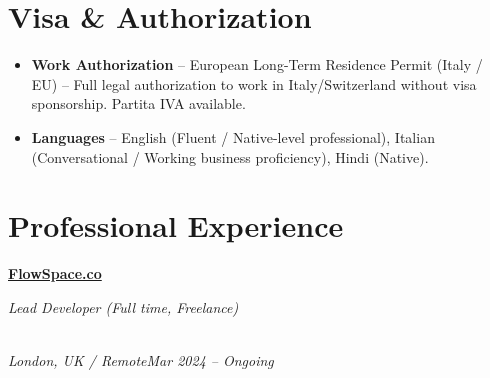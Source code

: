 \documentclass[a4paper,10pt]{article}
\newcommand{\role}[4]{\vspace{2pt}\noindent\hspace{0.6em}\parbox[t]{0.38\textwidth}{\raggedright\textbf{#1}}\hfill\parbox[t]{0.58\textwidth}{\raggedleft\textit{#2}}\\{\textit{#3}\hfill\textit{#4}}\vspace{1pt}}
\begin{document}
\section{Visa \& Authorization}
\begin{itemize}
\item \textbf{Work Authorization} -- European Long-Term Residence Permit (Italy / EU) -- Full legal authorization to work in Italy/Switzerland without visa sponsorship. Partita IVA available.
\item \textbf{Languages} -- English (Fluent / Native-level professional), Italian (Conversational / Working business proficiency), Hindi (Native).
\end{itemize}

\section{Professional Experience}
\role{\href{https://flowspace.co}{FlowSpace.co}}{Lead Developer (Full time, Freelance)}{London, UK / Remote}{Mar 2024 -- Ongoing}
\end{document}
